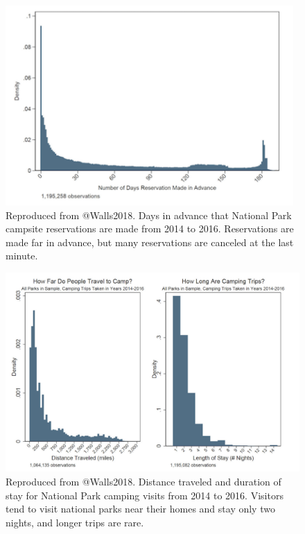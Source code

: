 \documentclass[
  11 pt,
  openany]{book}
\begin{document}
\begin{figure}
\includegraphics[width=4.32in]{images/problem_statement_figure_2} \caption{Reproduced from @Walls2018. Days in advance that National Park campsite reservations are made from 2014 to 2016. Reservations are made far in advance, but many reservations are canceled at the last minute.}\label{fig:fig2}
\end{figure}

\begin{figure}
\includegraphics[width=6.4in]{images/problem_statement_figure_3} \caption{Reproduced from @Walls2018. Distance traveled and duration of stay for National Park camping visits from 2014 to 2016. Visitors tend to visit national parks near their homes and stay only two nights, and longer trips are rare.}\label{fig:fig3}
\end{figure}
\end{document}
